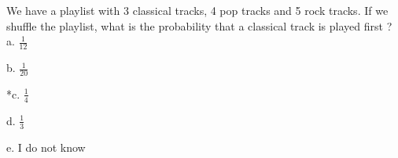 
We have a playlist with 3 classical tracks, 4 pop tracks and 5 rock
tracks. If we shuffle the playlist, what is the probability that a
classical track is played first ? \\

a. \(\frac{1}{12}\)

b. \(\frac{1}{20}\)

*c. \(\frac{1}{4}\)

d. \(\frac{1}{3}\)

e. I do not know \\

